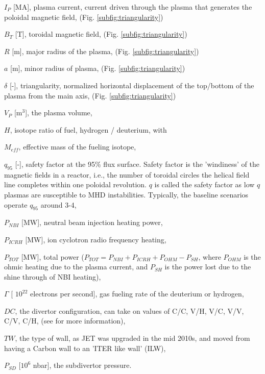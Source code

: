 \documentclass[a4paper, twoside, final, 12pt]{article}
\newenvironment{packed_enum}{
\begin{itemize}
  \setlength{\itemsep}{5pt}
  \setlength{\parskip}{0pt}
  \setlength{\parsep}{0pt}
}{\end{itemize}}
\begin{document}
\begin{packed_enum}
	\item $I_P$ [MA], plasma current, current driven through the plasma that generates the poloidal magnetic field, (Fig. \ref{subfig:triangularity})
	\item $B_T$ [T], toroidal magnetic field, (Fig. \ref{subfig:triangularity})
	\item $R$ [m], major radius of the plasma, (Fig. \ref{subfig:triangularity})
	\item $a$ [m], minor radius of plasma, (Fig. \ref{subfig:triangularity})
	\item $\delta$ [-], triangularity, normalized horizontal displacement of the top/bottom of the plasma from the main axis, (Fig. \ref{subfig:triangularity})
	\item $V_P$ [m$^3$], the plasma volume,
	\item $H$, isotope ratio of fuel, hydrogen / deuterium, with 
	\item $M_{eff}$, effective mass of the fueling isotope,
	\item $q_{95}$ [-], safety factor at the 95\% flux surface. Safety factor is the 'windiness' of the magnetic fields in a reactor, i.e., the  number of toroidal circles the helical field line completes within one poloidal revolution. $q$ is called the safety factor as low $q$ plasmas are susceptible to MHD instabilities. Typically, the baseline scenarios operate  $q_{95}$ around 3-4,
	\item $P_{NBI}$ [MW], neutral beam injection heating power,
	\item $P_{ICRH}$ [MW], ion cyclotron radio frequency heating, 
	\item $P_{TOT}$ [MW], total power ($P_{TOT} = P_{NBI}+ P_{ICRH} + P_{OHM} - P_{SH}$, where $P_{OHM}$ is the ohmic heating due to the plasma current, and $P_{SH}$ is the power lost due to the shine through of NBI heating),
	\item $\Gamma$ [ $10^{22}$ electrons per second], gas fueling rate of the deuterium or hydrogen,  
	\item $DC$, the divertor configuration, can take on values of C/C, V/H, V/C, V/V, C/V, C/H, (see \cite{Frassinetti_2020} for more information),
	\item $TW$, the type of wall, as JET was upgraded in the mid 2010s, and moved from having a Carbon wall to an 'ITER like wall' (ILW),
	\item $P_{SD}$ [$10^6$ nbar], the subdivertor pressure.
\end{packed_enum}
\end{document}
